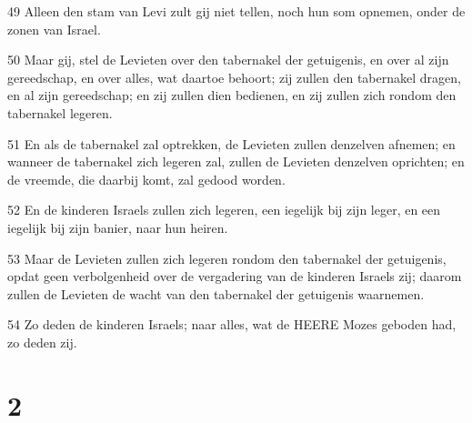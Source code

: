 \par 49 Alleen den stam van Levi zult gij niet tellen, noch hun som opnemen, onder de zonen van Israel.
\par 50 Maar gij, stel de Levieten over den tabernakel der getuigenis, en over al zijn gereedschap, en over alles, wat daartoe behoort; zij zullen den tabernakel dragen, en al zijn gereedschap; en zij zullen dien bedienen, en zij zullen zich rondom den tabernakel legeren.
\par 51 En als de tabernakel zal optrekken, de Levieten zullen denzelven afnemen; en wanneer de tabernakel zich legeren zal, zullen de Levieten denzelven oprichten; en de vreemde, die daarbij komt, zal gedood worden.
\par 52 En de kinderen Israels zullen zich legeren, een iegelijk bij zijn leger, en een iegelijk bij zijn banier, naar hun heiren.
\par 53 Maar de Levieten zullen zich legeren rondom den tabernakel der getuigenis, opdat geen verbolgenheid over de vergadering van de kinderen Israels zij; daarom zullen de Levieten de wacht van den tabernakel der getuigenis waarnemen.
\par 54 Zo deden de kinderen Israels; naar alles, wat de HEERE Mozes geboden had, zo deden zij.

\chapter{2}

